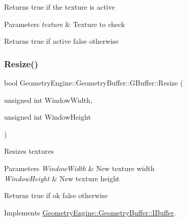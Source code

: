 Returns true if the texture is active 
\begin{DoxyParams}{Parameters}
{\em texture} & Texture to check \\
\hline
\end{DoxyParams}
\begin{DoxyReturn}{Returns}
true if active false otherwise 
\end{DoxyReturn}
\mbox{\label{class_geometry_engine_1_1_geometry_buffer_1_1_g_buffer_a487fb4fb346b34e5fa4a994e97211bab}} 
\subsubsection{\texorpdfstring{Resize()}{Resize()}}
{\footnotesize\ttfamily bool Geometry\+Engine\+::\+Geometry\+Buffer\+::\+G\+Buffer\+::\+Resize (\begin{DoxyParamCaption}\item[{unsigned int}]{Window\+Width,  }\item[{unsigned int}]{Window\+Height }\end{DoxyParamCaption})\hspace{0.3cm}{\ttfamily [virtual]}}

Resizes textures 
\begin{DoxyParams}{Parameters}
{\em Window\+Width} & New texture width \\
\hline
{\em Window\+Height} & New texture height \\
\hline
\end{DoxyParams}
\begin{DoxyReturn}{Returns}
true if ok false otherwise 
\end{DoxyReturn}


Implements \mbox{\hyperlink{class_geometry_engine_1_1_geometry_buffer_1_1_i_buffer_a3b764e340ccb06bee072d1bd95b007df}{Geometry\+Engine\+::\+Geometry\+Buffer\+::\+I\+Buffer}}.

\mbox{\label{class_geometry_engine_1_1_geometry_buffer_1_1_g_buffer_a71a3e1b70c0b96a1b63c033e8cf4b59f}} 
